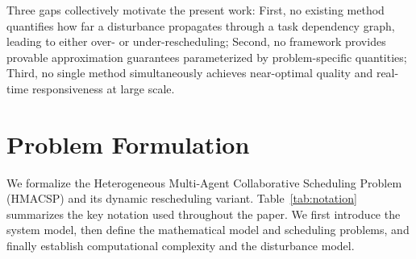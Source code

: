 \documentclass[manuscript,screen,review]{acmart}
\begin{document}
Three gaps collectively motivate the present work: 
First, no existing method
quantifies how far a disturbance propagates through a task dependency
graph, leading to either over- or under-rescheduling; 
Second, no framework provides provable approximation guarantees parameterized by
problem-specific quantities;
Third, no single method simultaneously achieves near-optimal quality and
real-time responsiveness at large scale.

\section{Problem Formulation}
\label{sec:problem}

We formalize the Heterogeneous Multi-Agent Collaborative Scheduling Problem (HMACSP)
and its dynamic rescheduling variant. Table~\ref{tab:notation} summarizes the key
notation used throughout the paper. We first introduce the system model, then define the mathematical model and
scheduling problems, and finally establish
computational complexity and the disturbance model.
\end{document}
